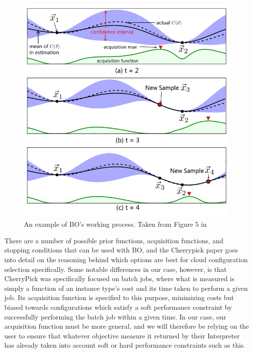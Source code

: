 \documentclass{report}
\begin{document}
\begin{figure}[!hb]
  \centering
   \includegraphics[scale=0.5]{Cherrypic}
  \caption{An example of BO's working process. Taken from Figure 5 in \cite{Alipourfard2017}}
  \label{fig:cherrypic}
\end{figure}

There are a number of possible prior functions, acquisition functions, and stopping conditions that can be used with BO, and the Cherrypick paper goes into detail on the reasoning behind which options are best for cloud configuration selection specifically\cite{Alipourfard2017}. Some notable differences in our case, however, is that CherryPick was specifically focused on batch jobs, where what is measured is simply a function of an instance type's cost and its time taken to perform a given job. Its acquisition function is specified to this purpose, minimizing costs but biased towards configurations which satisfy a soft performance constraint by successfully performing the batch job within a given time. In our case, our acquisition function must be more general, and we will therefore be relying on the user to ensure that whatever objective measure it returned by their Interpreter has already taken into account soft or hard performance constraints such as this.
\end{document}

